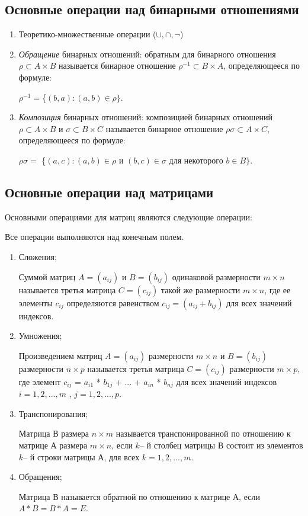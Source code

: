 \documentclass[bachelor, och, labwork]{shiza}
\begin{document}
\subsection{Основные операции над бинарными отношениями}

\begin{enumerate}
	\item Теоретико-множественные операции ($\cup, \cap, \neg$)
	\item \textit{Обращение} бинарных отношений: обратным для бинарного отношения $\rho \subset A \times B$ называется бинарное
	отношение $\rho^{-1} \subset B \times A$, определяющееся по формуле:

		$\rho^{-1} = $\{$(b, a) : (a, b) \in \rho \}$.

	\item \textit{Композиция} бинарных отношений: композицией бинарных отношений $\rho \subset A \times B$ и $\sigma \subset B \times C$
	называется бинарное отношение $\rho\sigma \subset A \times C$, определяющееся по формуле:

		$\rho\sigma = $ \{$(a, c) : (a, b) \in \rho \text{ и } (b, c) \in \sigma \text{ для некоторого } b \in B
		\}$.

\end{enumerate}
	
\subsection{Основные операции над матрицами}

	Основными операциями для матриц являются следующие операции: 
	
	Все операции выполняются над конечным полем.
	
	\begin{enumerate}
	\item Сложения;
	
	Суммой матриц $A = (a_{ij})$ и $B = (b_{ij})$ одинаковой размерности $m \times n$ называется третья матрица $C = (c_{ij})$ такой же размерности $m \times n$, где ее элементы $c_{ij}$ определяются равенством $c_{ij} = (a_{ij} + b_{ij})$ для всех значений индексов.
	
	\item Умножения;
	
	Произведением матриц $A = (a_{ij})$ размерности $m \times n$ и $B = (b_{ij})$ размерности $n \times p$ называется третья матрица $C = (c_{ij})$ размерности $m \times p$, где элемент $c_{ij}$ = $a_{i1}$ * $b_{1j}$ + ... + $a_{in}$ * $b_{nj}$ для всех значений индексов $i = 1,2,...,m$ , $j = 1,2,...,p$.
	
	\item Транспонирования;
	
	Матрица В размера $n \times m$ называется транспонированной по отношению к матрице А размера $m \times n$, если $k$– й столбец матрицы В состоит из элементов $k$– й строки матрицы А, для всех $k = 1,2,...,m$.
	
	\item Обращения;
	
	Матрица В называется обратной по отношению к матрице А, если
	$A * B = B  * A = E$.
	
	\end{enumerate}
\end{document}
